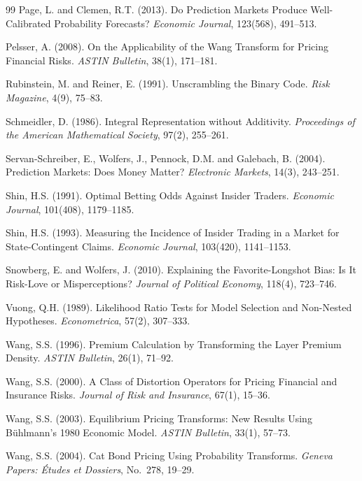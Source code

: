 \documentclass[12pt,a4paper]{article}
\begin{document}
\begin{thebibliography}{99}
 Page, L. and Clemen, R.T. (2013). Do Prediction Markets Produce
  Well-Calibrated Probability Forecasts? \emph{Economic Journal},
  123(568), 491--513.

 Pelsser, A. (2008). On the Applicability of the Wang Transform for
  Pricing Financial Risks. \emph{ASTIN Bulletin}, 38(1), 171--181.

 Rubinstein, M. and Reiner, E. (1991). Unscrambling the Binary Code.
  \emph{Risk Magazine}, 4(9), 75--83.

 Schmeidler, D. (1986). Integral Representation without Additivity.
  \emph{Proceedings of the American Mathematical Society}, 97(2),
  255--261.

 Servan-Schreiber, E., Wolfers, J., Pennock, D.M. and Galebach, B.
  (2004). Prediction Markets: Does Money Matter? \emph{Electronic
  Markets}, 14(3), 243--251.

 Shin, H.S. (1991). Optimal Betting Odds Against Insider Traders.
  \emph{Economic Journal}, 101(408), 1179--1185.

 Shin, H.S. (1993). Measuring the Incidence of Insider Trading in a
  Market for State-Contingent Claims. \emph{Economic Journal}, 103(420),
  1141--1153.

 Snowberg, E. and Wolfers, J. (2010). Explaining the Favorite-Longshot
  Bias: Is It Risk-Love or Misperceptions? \emph{Journal of Political
  Economy}, 118(4), 723--746.

 Vuong, Q.H. (1989). Likelihood Ratio Tests for Model Selection and
  Non-Nested Hypotheses. \emph{Econometrica}, 57(2), 307--333.

 Wang, S.S. (1996). Premium Calculation by Transforming the Layer
  Premium Density. \emph{ASTIN Bulletin}, 26(1), 71--92.

 Wang, S.S. (2000). A Class of Distortion Operators for Pricing
  Financial and Insurance Risks. \emph{Journal of Risk and Insurance},
  67(1), 15--36.

 Wang, S.S. (2003). Equilibrium Pricing Transforms: New Results Using
  Bühlmann's 1980 Economic Model. \emph{ASTIN Bulletin}, 33(1), 57--73.

 Wang, S.S. (2004). Cat Bond Pricing Using Probability Transforms.
  \emph{Geneva Papers: Études et Dossiers}, No.~278, 19--29.


\end{thebibliography}
\end{document}
